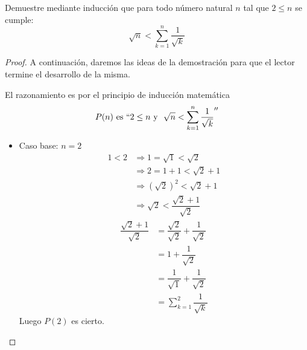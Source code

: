 \begin{ejercicio}
Demuestre mediante inducción que para todo número natural $n$ tal que $2 \leq n$ se cumple:
\begin{equation*}
    \sqrt{n} < \sum_{k=1}^n \dfrac{1}{\sqrt{k}}
\end{equation*}
\begin{proof}
    A continuación, daremos las ideas de la demostración para que el lector termine el desarrollo de la misma.

    El razonamiento es por el principio de inducción matemática 
    \begin{equation*}%
        P(n) \text{\ es\ } ``2\leq n \text{\ y \ } \sqrt{n} < \sum_{k=1}^n \dfrac{1}{\sqrt{k}} ''
    \end{equation*}
    \begin{itemize}
        \item Caso base: $n = 2$
        \begin{align*}
            1 < 2 &\Rightarrow 1 = \sqrt{1} < \sqrt{2}\\
            &\Rightarrow 2 = 1+1 < \sqrt{2} +1\\
            &\Rightarrow (\sqrt{2})^2 < \sqrt{2} + 1\\
            &\Rightarrow \sqrt{2} < \dfrac{\sqrt{2}+1}{\sqrt{2}}
        \end{align*}
        \begin{align*}
            \dfrac{\sqrt{2}+1}{\sqrt{2}}&= \dfrac{\sqrt{2}}{\sqrt{2}}+\dfrac{1}{\sqrt{2}}\\
            &= 1 + \dfrac{1}{\sqrt{2}}\\
            &= \dfrac{1}{\sqrt{1}} + \dfrac{1}{\sqrt{2}}\\
            &= \sum_{k=1}^2 \dfrac{1}{\sqrt{k}}
        \end{align*}
        Luego $P(2)$ es cierto.


\end{itemize}
\end{proof}
\end{ejercicio}

